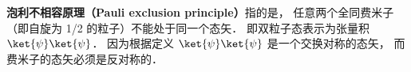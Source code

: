 
\textbf{泡利不相容原理（Pauli exclusion principle）}指的是， 任意两个全同费米子（即自旋为 1/2 的粒子）不能处于同一个态矢． 即双粒子态表示为张量积 $\ket{\psi}\ket{\psi}$． 因为根据定义 $\ket{\psi}\ket{\psi}$ 是一个交换对称的态矢， 而费米子的态矢必须是反对称的．
